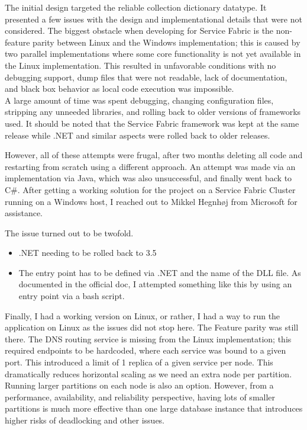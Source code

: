 \documentclass[a4paper,10pt,titlepage]{report}
\begin{document}
The initial design targeted the reliable collection dictionary datatype. It presented a few issues with the design and implementational details that were not considered. The biggest obstacle when developing for Service Fabric is the non-feature parity between Linux and the Windows implementation; this is caused by two parallel implementations where some core functionality is not yet available in the Linux implementation. This resulted in unfavorable conditions with no debugging support, dump files that were not readable, lack of documentation, and black box behavior as local code execution was impossible. \\ \vspace{5mm}
A large amount of time was spent debugging, changing configuration files, stripping any unneeded libraries, and rolling back to older versions of frameworks used. It should be noted that the Service Fabric framework was kept at the same release while .NET and similar aspects were rolled back to older releases.

However, all of these attempts were frugal, after two months deleting all code and restarting from scratch using a different approach. An attempt was made via an implementation via Java, which was also unsuccessful, and finally went back to C\#. After getting a working solution for the project on a Service Fabric Cluster running on a Windows host, I reached out to Mikkel Hegnhøj from Microsoft for assistance.

The issue turned out to be twofold.
\begin{itemize}
    \item .NET needing to be rolled back to 3.5
    \item The entry point has to be defined via .NET and the name of the DLL file. As documented in the official doc, I attempted something like this by using an entry point via a bash script. 
\end{itemize}

Finally, I had a working version on Linux, or rather, I had a way to run the application on Linux as the issues did not stop here. The Feature parity was still there. The DNS routing service is missing from the Linux implementation; this required endpoints to be hardcoded, where each service was bound to a given port. This introduced a limit of 1 replica of a given service per node. This dramatically reduces horizontal scaling as we need an extra node per partition. Running larger partitions on each node is also an option. However, from a performance, availability, and reliability perspective, having lots of smaller partitions is much more effective than one large database instance that introduces higher risks of deadlocking and other issues.
\end{document}
